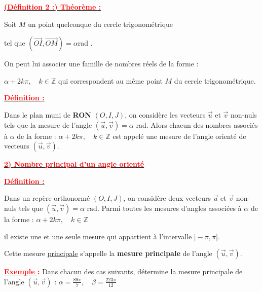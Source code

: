\documentclass{article}
\begin{document}
\underline{\textbf{\textcolor{red}{(Définition 2 :) Théorème :}}}

\vspace{0.5cm}

Soit $M$ un point quelconque du cercle trigonométrique 

tel que $(\overrightarrow{OI}, \overrightarrow{OM}) = \alpha $rad . 

On peut lui associer une famille de nombres réels de la forme :

$\alpha + 2k\pi, \quad k \in \mathbb{Z}$ qui correspondent au même point $M$ du cercle trigonométrique.

\vspace{0.5cm}

\underline{\textbf{\textcolor{red}{Définition :}}}

Dans le plan muni de \textbf{RON} $(O, I, J)$, on considère les vecteurs $\overrightarrow{u}$ et $\overrightarrow{v}$ non-nuls tels que la mesure de l'angle $(\overrightarrow{u}, \overrightarrow{v}) = \alpha$ rad.  
Alors chacun des nombres associés à $\alpha$ de la forme : $\alpha + 2k\pi, \quad k \in \mathbb{Z}$ est appelé une mesure de l'angle orienté de vecteurs $(\overrightarrow{u}, \overrightarrow{v})$.

\vspace{0.5cm}

\underline{\textbf{\textcolor{red}{2) Nombre principal d'un angle orienté}}}

\vspace{0.5cm}

\underline{\textbf{\textcolor{red}{Définition :}}}

Dans un repère orthonormé $(O, I, J)$, on considère deux vecteurs $\overrightarrow{u}$ et $\overrightarrow{v}$ non-nuls tels que $(\overrightarrow{u}, \overrightarrow{v}) = \alpha \text{ rad}$.  
Parmi toutes les mesures d'angles associées à $\alpha$ de la forme : $\alpha + 2k\pi, \quad k \in \mathbb{Z}$

il existe une et une seule mesure qui appartient à l'intervalle $]-\pi, \pi]$.  

Cette mesure \uline{principale} s'appelle la \textbf{mesure principale} de l'angle $(\overrightarrow{u}, \overrightarrow{v})$.

\vspace{0.5cm}

\underline{\textbf{\textcolor{red}{Exemple :}}}  
Dans chacun des cas suivants, détermine la mesure principale de l'angle $(\overrightarrow{u}, \overrightarrow{v})$ : $\alpha = \frac{89\pi}{7}, \quad \beta = \frac{223\pi}{12}$
\end{document}
